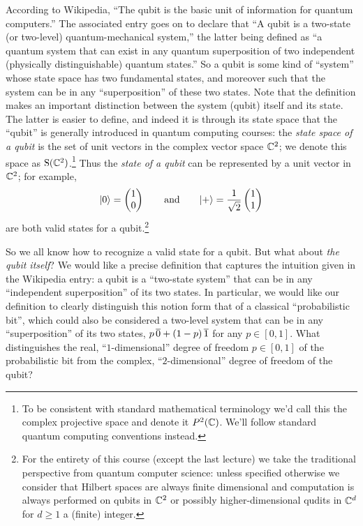 According to Wikipedia, ``The qubit is the basic unit of information for quantum computers.'' The associated entry goes on to declare that ``A qubit is a two-state (or two-level) quantum-mechanical system,'' the latter being defined as ``a quantum system that can exist in any quantum superposition of two independent (physically distinguishable) quantum states.'' So a qubit is some kind of ``system'' whose state space has two fundamental states, and moreover such that the system can be in any ``superposition'' of these two states. Note that the definition makes an important distinction between the system (qubit) itself and its state. The latter is easier to define, and indeed it is through its state space that the  ``qubit'' is generally introduced in quantum computing courses: the \emph{state space of a qubit} is the set of unit vectors in the complex vector space $\mathbb{C}^2$; we denote this space as $\mathrm{S}(\mathbb{C}^2)$.\footnote{To be consistent with standard mathematical terminology we'd call this the complex projective space and denote it $P^2(\mathbb{C})$. We'll follow standard quantum computing conventions instead.} Thus the \emph{state of a qubit} can be represented by a unit vector in $\mathbb{C}^2$; for example, 
\[|0\rangle = \begin{pmatrix} 1 \\ 0 \end{pmatrix}\qquad\text{and}\qquad |+\rangle = \frac{1}{\sqrt{2}}\begin{pmatrix} 1 \\ 1 \end{pmatrix}\]
are both valid states for a qubit.\footnote{For the entirety of this course (except the last lecture) we take the traditional perspective from quantum computer science: unless specified otherwise we consider that Hilbert spaces are always finite dimensional and computation is always performed on qubits in $\mathbb{C}^2$ or possibly higher-dimensional qudits in $\mathbb{C}^d$ for $d\geq 1$ a (finite) integer.}

So we all know how to recognize a valid state for a qubit. But what about \emph{the qubit itself}? We would like a precise definition that captures the intuition given in the Wikipedia entry: a qubit is a ``two-state system'' that can be in any ``independent superposition'' of its two states. In particular, we would like our definition to clearly distinguish this notion form that of a classical ``probabilistic bit'', which could also be considered a two-level system that can be in any ``superposition'' of its two states, $p \,\overline{0} + (1-p)\,\overline{1}$ for any $p\in [0,1]$. What distinguishes the real, ``$1$-dimensional'' degree of freedom $p\in [0,1]$  of the probabilistic bit from the complex, ``$2$-dimensional'' degree of freedom of the qubit?

